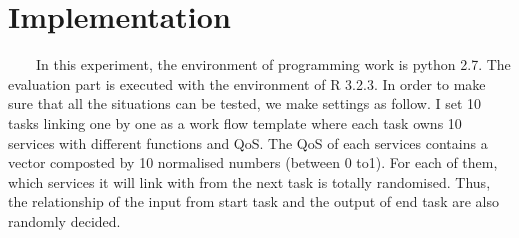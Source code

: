 \documentclass[senior,final,11pt]{iscs-thesis}
\begin{document}
\section{Implementation}
~~~~In this experiment, the environment of programming work is python 2.7. The evaluation part is executed with the environment of R 3.2.3. In order to make sure that all the situations can be tested, we make settings as follow. 
I set 10 tasks linking one by one as a work flow template where each task owns 10 services with different functions and QoS. The QoS of each services contains a vector composted by 10 normalised numbers (between 0 to1).
For each of them, which services it will link with from the next task is totally randomised. 
Thus, the relationship of the input from start task and the output of end task are also randomly decided.
\end{document}
